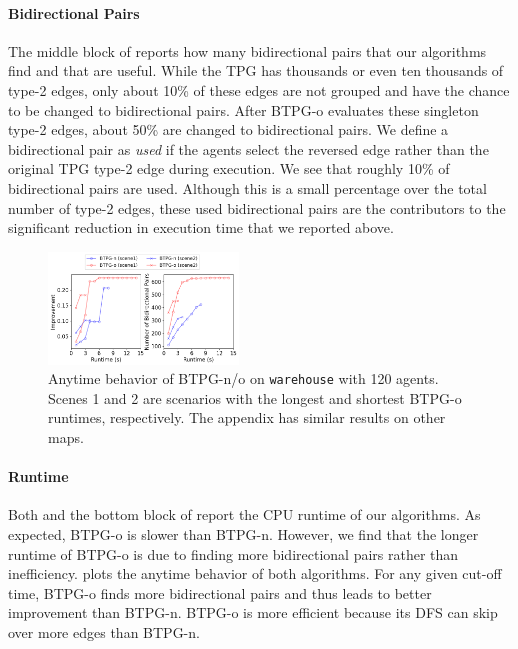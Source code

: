 \documentclass[letterpaper]{article} %
\theoremstyle{definition}
\begin{document}
\paragraph{Bidirectional Pairs} The middle block of  reports how many bidirectional pairs that our algorithms find and that are useful. While the TPG has thousands or even ten thousands of type-2 edges, only about 10\% of these edges are not grouped and have the chance to be changed to bidirectional pairs. After BTPG-o evaluates these singleton type-2 edges, about 50\% are changed to bidirectional pairs. We define a bidirectional pair as \emph{used} if the agents select the reversed edge rather than the original TPG type-2 edge during execution. We see that roughly 10\% of bidirectional pairs are used. Although this is a small percentage over the total number of type-2 edges, these used bidirectional pairs are the contributors to the significant reduction in execution time that we reported above.




\begin{figure}[t!]
\centering
\includegraphics[width=0.45\textwidth]{Figs/anytime_warehouse.png}
\caption{Anytime behavior of BTPG-n/o on \texttt{warehouse} with 120 agents. Scenes 1 and 2 are scenarios with the longest and shortest BTPG-o runtimes, respectively. The appendix has similar results on other maps.}
\label{fig:anytime}
\end{figure}

\paragraph{Runtime}
Both  and the bottom block of  report the CPU runtime of our algorithms. As expected, BTPG-o is slower than BTPG-n. %
However, we find that the longer runtime of BTPG-o is due to finding more bidirectional pairs rather than inefficiency.  plots the anytime behavior of both algorithms. For any given cut-off time, BTPG-o finds more bidirectional pairs and thus leads to better improvement than BTPG-n. BTPG-o is more efficient because its DFS can skip over more edges than BTPG-n.
\end{document}
